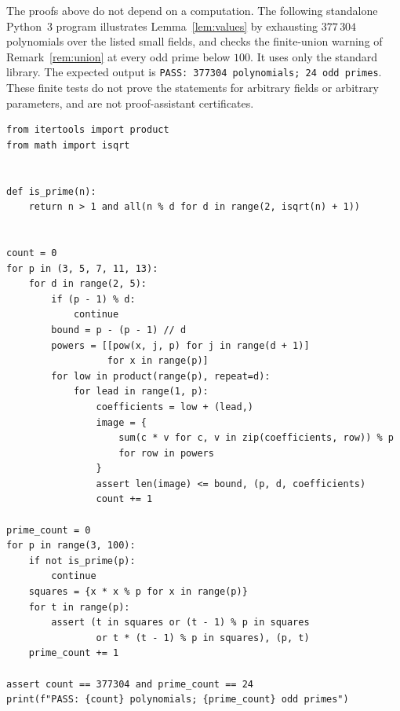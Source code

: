 \documentclass[11pt,a4paper]{article}
\theoremstyle{definition}
\theoremstyle{remark}
\begin{document}
The proofs above do not depend on a computation. The following standalone
Python~3 program illustrates Lemma~\ref{lem:values} by exhausting
$377\,304$ polynomials over the listed small fields, and checks the
finite-union warning of Remark~\ref{rem:union} at every odd prime below
$100$. It uses only the standard library. The expected output is
\texttt{PASS: 377304 polynomials; 24 odd primes}. These finite tests do
not prove the statements for arbitrary fields or arbitrary parameters,
and are not proof-assistant certificates.

\begingroup\small
\begin{verbatim}
from itertools import product
from math import isqrt


def is_prime(n):
    return n > 1 and all(n % d for d in range(2, isqrt(n) + 1))


count = 0
for p in (3, 5, 7, 11, 13):
    for d in range(2, 5):
        if (p - 1) % d:
            continue
        bound = p - (p - 1) // d
        powers = [[pow(x, j, p) for j in range(d + 1)]
                  for x in range(p)]
        for low in product(range(p), repeat=d):
            for lead in range(1, p):
                coefficients = low + (lead,)
                image = {
                    sum(c * v for c, v in zip(coefficients, row)) % p
                    for row in powers
                }
                assert len(image) <= bound, (p, d, coefficients)
                count += 1

prime_count = 0
for p in range(3, 100):
    if not is_prime(p):
        continue
    squares = {x * x % p for x in range(p)}
    for t in range(p):
        assert (t in squares or (t - 1) % p in squares
                or t * (t - 1) % p in squares), (p, t)
    prime_count += 1

assert count == 377304 and prime_count == 24
print(f"PASS: {count} polynomials; {prime_count} odd primes")
\end{verbatim}
\endgroup
\end{document}

